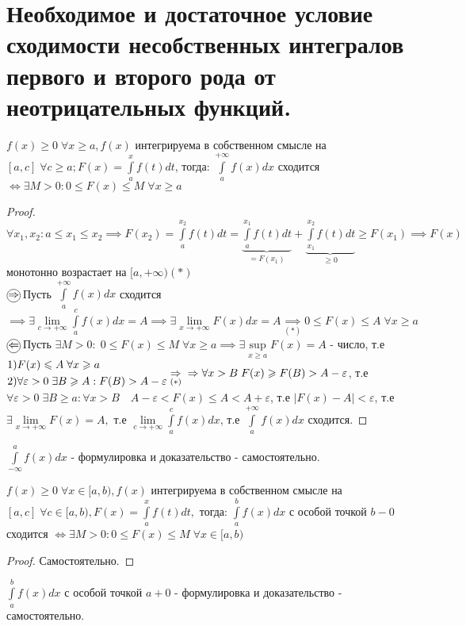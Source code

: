 \documentclass[../main.tex]{subfiles}
\begin{document}
\section{Необходимое и достаточное условие сходимости несобственных интегралов первого и второго рода от неотрицательных функций.}
\begin{theorem}
    $f(x)\geqslant 0 \;\forall x\geqslant a, f(x)$ интегрируема в собственном смысле на $[a,c]\; \forall c\geqslant a; F(x)=\int\limits_{a  }^{x} f(t)dt$, тогда: $\int\limits_{a   }^{+\infty}f(x)dx $ сходится $\Leftrightarrow \exists M>0 : 0\leqslant F(x)\leqslant M \; \forall x\geqslant a$
\end{theorem}
\begin{proof}
    $\forall x_{1},x_{2} : a\leqslant x_{1}\leqslant x_{2}\implies F(x_{2})=\int\limits_{a  }^{x_{2}}f(t)dt= \underbrace{\int\limits_{a }^{x_{1}}f(t)dt}_{=F(x_{1})} +\underbrace{\int\limits_{x_{1}}^{x_{2}} f(t)dt}_{\geqslant 0} \geqslant F(x_{1})\implies F(x)$ монотонно возрастает на $[a,+\infty) (*)$
    \\ $\tcircle{$\implies$}$ Пусть $\int\limits_{a    }^{+\infty}f(x)dx  $ сходится $\implies \exists \lim\limits_{c  \to +\infty}\int\limits_{a  }^{c    } f(x)dx=A \implies \exists \lim\limits_{x\to +\infty}F(x)dx  =A \underset{(*)}{\implies} 0\leqslant F(x)\leqslant A \; \forall x\geqslant a$ 
    \\ $\tcircle{$\impliedby$}$ Пусть $\exists M>0: \; 0\leqslant F(x)\leqslant M \; \forall x\geqslant a\implies \exists \underset{x\geqslant a}{\sup}{F(x)}=A$ - число, т.е $\begin{aligned}&1) F(x)\leqslant A \; \forall x\geqslant a \\ &2) \forall \varepsilon>0 \;\exists  B \geqslant A: F(B)> A-\varepsilon\end{aligned}\underset{(*)}{\implies}\\\implies\forall x>B \; F(x)\geqslant F(B)> A-\varepsilon$, т.е $\forall \varepsilon>0 \;\exists B\geqslant a: \forall x> B \quad A-\varepsilon<F(x)\leqslant A<A+\varepsilon$, т.е $|F(x)-A| <\varepsilon$, т.е $\exists \lim\limits_{x\to +\infty}F(x)=A ,$ т.е $ \lim\limits_{ c \to +\infty}\int\limits_{a  }^{c    } f(x)dx$, т.е $\int\limits_{a  }^{+\infty}f(x)dx $ сходится.
\end{proof}
$\int\limits_{-\infty   }^{a    } f(x)dx$ - формулировка и доказательство - самостоятельно.

\begin{theorem}
    $f(x)\geqslant 0 \; \forall x \in [a,b), f(x)$ интегрируема в собственном смысле на $[a,c] \; \forall c\in [a,b) , F(x)= \int\limits_{a }^{x} f(t)dt,$ тогда: $\int\limits_{a   }^{b    } f(x)dx$ с особой точкой $b-0 $ сходится $\Leftrightarrow \exists M>0: 0\leqslant F(x)\leqslant M \; \forall x\in[a,b) $ 
\end{theorem}
\begin{proof}
    Самостоятельно.
\end{proof}
$\int\limits_{a }^{b    } f(x)dx$ с особой точкой $a+0$ - формулировка и доказательство - самостоятельно.
\end{document}
